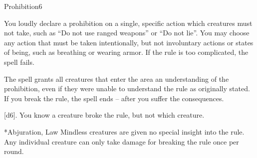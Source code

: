 \begin{spellsection}{Prohibition}{6}
    \begin{spellheader}
    \end{spellheader}
    \begin{spellcontent}
        \begin{spelltargetinginfo}
        \end{spelltargetinginfo}
        \begin{spelleffects}
            \spelleffect You loudly declare a prohibition on a single, specific action which creatures must not take, such as ``Do not use ranged weapons'' or ``Do not lie''. You may choose any action that must be taken intentionally, but not involuntary actions or states of being, such as breathing or wearing armor. If the rule is too complicated, the spell fails.

            The spell grants all creatures that enter the area an understanding of the prohibition, even if they were unable to understand the rule as originally stated. If you break the rule, the spell ends -- after you suffer the consequences.
            \spelldur \durshort
        \end{spelleffects}
    \end{spellcontent}
    \begin{spellsubcontent}
        \begin{spelltargetinginfo}
        \end{spelltargetinginfo}
        \begin{spelleffects}
            \spelleffect {}[d6]. You know a creature broke the rule, but not which creature.
        \end{spelleffects}
    \end{spellsubcontent}
    \begin{spellfooter}
        *{Abjuration, Law}
        \spellnotes Mindless creatures are given no special insight into the rule. Any individual creature can only take damage for breaking the rule once per round.
        \miscastexplode
    \end{spellfooter}
\end{spellsection}

